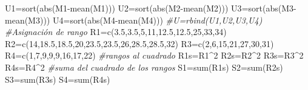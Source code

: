 \documentclass[
  a4paper,
  oneside,
  openany]{book}
\newenvironment{Shaded}{\begin{snugshade}}{\end{snugshade}}
\newcommand{\CommentTok}[1]{\textcolor[rgb]{0.56,0.35,0.01}{\textit{#1}}}
\newcommand{\DecValTok}[1]{\textcolor[rgb]{0.00,0.00,0.81}{#1}}
\newcommand{\FloatTok}[1]{\textcolor[rgb]{0.00,0.00,0.81}{#1}}
\newcommand{\FunctionTok}[1]{\textcolor[rgb]{0.00,0.00,0.00}{#1}}
\newcommand{\NormalTok}[1]{#1}
\newcommand{\OtherTok}[1]{\textcolor[rgb]{0.56,0.35,0.01}{#1}}
\newcommand{\SpecialCharTok}[1]{\textcolor[rgb]{0.00,0.00,0.00}{#1}}
\begin{document}
\begin{Shaded}
\begin{Highlighting}[]
\NormalTok{U1}\OtherTok{=}\FunctionTok{sort}\NormalTok{(}\FunctionTok{abs}\NormalTok{(M1}\SpecialCharTok{{-}}\FunctionTok{mean}\NormalTok{(M1)))}
\NormalTok{U2}\OtherTok{=}\FunctionTok{sort}\NormalTok{(}\FunctionTok{abs}\NormalTok{(M2}\SpecialCharTok{{-}}\FunctionTok{mean}\NormalTok{(M2)))}
\NormalTok{U3}\OtherTok{=}\FunctionTok{sort}\NormalTok{(}\FunctionTok{abs}\NormalTok{(M3}\SpecialCharTok{{-}}\FunctionTok{mean}\NormalTok{(M3)))}
\NormalTok{U4}\OtherTok{=}\FunctionTok{sort}\NormalTok{(}\FunctionTok{abs}\NormalTok{(M4}\SpecialCharTok{{-}}\FunctionTok{mean}\NormalTok{(M4)))}
\CommentTok{\#U=rbind(U1,U2,U3,U4)}
\CommentTok{\#Asignación de rango}
\NormalTok{R1}\OtherTok{=}\FunctionTok{c}\NormalTok{(}\FloatTok{3.5}\NormalTok{,}\FloatTok{3.5}\NormalTok{,}\DecValTok{5}\NormalTok{,}\DecValTok{11}\NormalTok{,}\FloatTok{12.5}\NormalTok{,}\FloatTok{12.5}\NormalTok{,}\DecValTok{25}\NormalTok{,}\DecValTok{33}\NormalTok{,}\DecValTok{34}\NormalTok{)}
\NormalTok{R2}\OtherTok{=}\FunctionTok{c}\NormalTok{(}\DecValTok{14}\NormalTok{,}\FloatTok{18.5}\NormalTok{,}\FloatTok{18.5}\NormalTok{,}\DecValTok{20}\NormalTok{,}\FloatTok{23.5}\NormalTok{,}\FloatTok{23.5}\NormalTok{,}\DecValTok{26}\NormalTok{,}\FloatTok{28.5}\NormalTok{,}\FloatTok{28.5}\NormalTok{,}\DecValTok{32}\NormalTok{)}
\NormalTok{R3}\OtherTok{=}\FunctionTok{c}\NormalTok{(}\DecValTok{2}\NormalTok{,}\DecValTok{6}\NormalTok{,}\DecValTok{15}\NormalTok{,}\DecValTok{21}\NormalTok{,}\DecValTok{27}\NormalTok{,}\DecValTok{30}\NormalTok{,}\DecValTok{31}\NormalTok{)}
\NormalTok{R4}\OtherTok{=}\FunctionTok{c}\NormalTok{(}\DecValTok{1}\NormalTok{,}\DecValTok{7}\NormalTok{,}\DecValTok{9}\NormalTok{,}\DecValTok{9}\NormalTok{,}\DecValTok{9}\NormalTok{,}\DecValTok{16}\NormalTok{,}\DecValTok{17}\NormalTok{,}\DecValTok{22}\NormalTok{)}
\CommentTok{\#rangos al cuadrado}
\NormalTok{R1s}\OtherTok{=}\NormalTok{R1}\SpecialCharTok{\^{}}\DecValTok{2}
\NormalTok{R2s}\OtherTok{=}\NormalTok{R2}\SpecialCharTok{\^{}}\DecValTok{2}
\NormalTok{R3s}\OtherTok{=}\NormalTok{R3}\SpecialCharTok{\^{}}\DecValTok{2}
\NormalTok{R4s}\OtherTok{=}\NormalTok{R4}\SpecialCharTok{\^{}}\DecValTok{2}
\CommentTok{\#suma del cuadrado de los rangos}
\NormalTok{S1}\OtherTok{=}\FunctionTok{sum}\NormalTok{(R1s)}
\NormalTok{S2}\OtherTok{=}\FunctionTok{sum}\NormalTok{(R2s)}
\NormalTok{S3}\OtherTok{=}\FunctionTok{sum}\NormalTok{(R3s)}
\NormalTok{S4}\OtherTok{=}\FunctionTok{sum}\NormalTok{(R4s)}


\end{Highlighting}
\end{Shaded}
\end{document}
